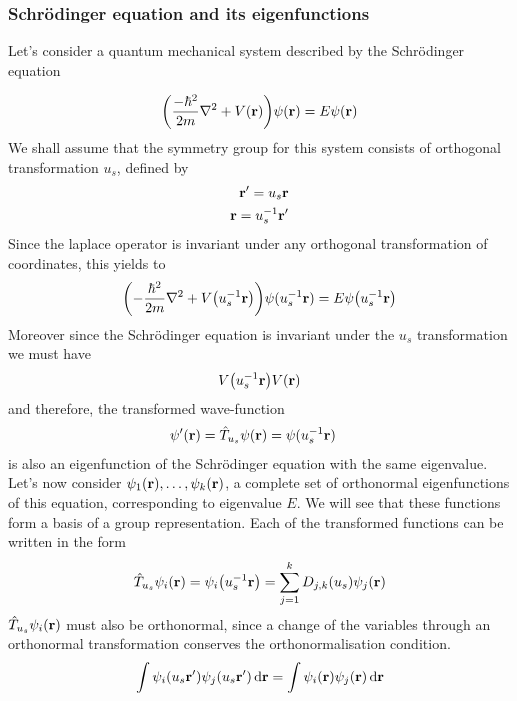 
\subsubsection{Schrödinger equation and its eigenfunctions} %
\label{sub:Schrödinger equation and its eigenfunctions}

Let's consider a quantum mechanical system described by the Schrödinger equation

\begin{align}
    \qty(\frac{-\hbar^2}{2m}\nabla^2+V(\vb{r}))\psi(\vb{r})=E\psi(\vb{r})
\end{align}
We shall assume that the symmetry group for this system consists of orthogonal
transformation $u_s$, defined by
\begin{align}
    \vb{r}'=u_s\vb{r}\\
    \vb{r}=u_s^{-1}\vb{r}'
\end{align}
Since the laplace operator is invariant under any orthogonal transformation of
coordinates, this yields to
\begin{align}
    \qty(-\frac{\hbar^2}{2m}\nabla^2+V\qty(u_s^{-1}\vb{r}))\psi(u_s^{-1}\vb{r})=E\psi
    \qty(u_s^{-1}\vb{r})
\end{align}
Moreover since the Schrödinger equation is invariant under the $u_s$ transformation
we must have
\begin{align}
    V\qty(u_s^{-1}\vb{r})V(\vb{r})
\end{align}
and therefore, the transformed wave-function
\begin{align}
    \psi'(\vb{r})&=\hat{T}_{u_s}\psi(\vb{r})=\psi(u_s^{-1}\vb{r})
\end{align}
is also an eigenfunction of the Schrödinger equation with the same eigenvalue.
Let's now consider $\psi_1(\vb{r}),\dots,\psi_k(\vb{r})$, a complete set of
orthonormal eigenfunctions of this equation, corresponding to eigenvalue $E$. We
will see that these functions form a basis of a group representation.
Each of the transformed functions can be written in the form
\begin{align}
    \hat{T}_{u_s}\psi_i(\vb{r})=\psi_i\qty(u^{-1}_s\vb{r})=\sum_{j=1}^kD_{j,k}
    (u_s)\psi_j(\vb{r})
\end{align}
$\hat{T}_{u_s}\psi_i(\vb{r})$ must also be orthonormal, since a change of the variables through an orthonormal transformation conserves the
orthonormalisation condition.
\begin{align}
    \int\psi_i(u_s\vb{r}')\psi_j(u_s\vb{r}')\dd{\vb{r}}=
    \int\psi_i(\vb{r})\psi_j(\vb{r})\dd{\vb{r}}
\end{align}
